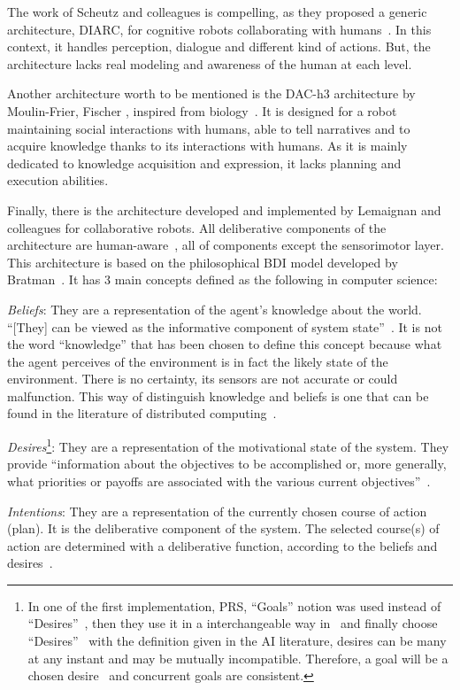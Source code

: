 \documentclass[a4paper,11pt,twoside]{StyleThese}
\begin{document}
The work of Scheutz and colleagues is compelling, as they proposed a generic architecture, DIARC, for cognitive robots collaborating with humans~\cite{scheutz_2006_utility,scheutz_2019_overview}. In this context, it handles perception, dialogue and different kind of actions. But, the architecture lacks real modeling and awareness of the human at each level.

Another architecture worth to be mentioned is the DAC-h3 architecture by Moulin-Frier, Fischer \etal, inspired from biology~\cite{moulin_2017_dac}. It is designed for a robot maintaining social interactions with humans, able to tell narratives and to acquire knowledge thanks to its interactions with humans. As it is mainly dedicated to knowledge acquisition and expression, it lacks planning and execution abilities.

Finally, there is the architecture developed and implemented by Lemaignan and colleagues for collaborative robots. All deliberative components of the architecture are human-aware~\cite{lemaignan_2017_artificial}, \ie all of components except the sensorimotor layer. This architecture is based on the philosophical BDI model developed by Bratman~\cite{bratman_1987_intention,bratman_1988_plans}. It has 3 main concepts defined as the following in computer science:
\begin{bulletList}
	\item \emph{Beliefs}: They are a representation of the agent’s knowledge about the world. ``[They] can be viewed as the informative component of system state''~\cite[p.~313]{rao_1995_bdi}. It is not the word ``knowledge'' that has been chosen to define this concept because what the agent perceives of the environment is in fact the likely state of the environment. There is no certainty, its sensors are not accurate or could malfunction. This way of distinguish knowledge and beliefs is one that can be found in the literature of distributed computing~\cite{lamarre_1994_knowledge}.
	\item \emph{Desires}\footnote{In one of the first implementation, PRS, ``Goals'' notion was used instead of ``Desires''~\cite{georgeff_1989_decision}, then they use it in a interchangeable way in~\cite{georgeff_1991_modeling} and finally choose ``Desires''~\cite{rao_1995_bdi} with the definition given in the AI literature, \eg desires can be many at any instant and may be mutually incompatible. Therefore, a goal will be a chosen desire~\cite{cohen_1990_intention} and concurrent goals are consistent.}: They are a representation of the motivational state of the system. They provide ``information about the objectives to be accomplished or, more generally, what priorities or payoffs are associated with the various current objectives''~\cite{rao_1995_bdi}. 
	\item \emph{Intentions}: They are a representation of the currently chosen course of action (plan). It is the deliberative component of the system. The selected course(s) of action are determined with a deliberative function, according to the beliefs and desires~\cite{rao_1995_bdi}.
\end{bulletList}
\end{document}
